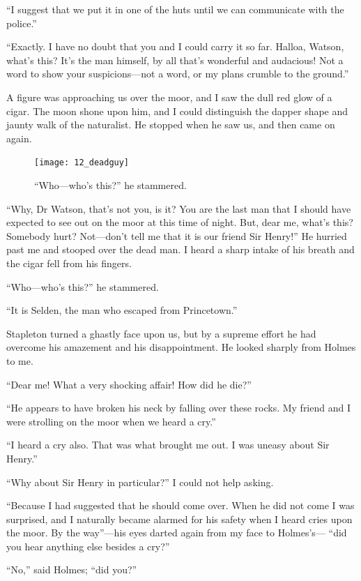 \documentclass[paper=a5,BCOR=7mm,twoside,DIV=calc,12pt,usegeometry,openany,chapterprefix,endperiod,headings=big]{scrbook} %
\begin{document}
\enquote{I suggest that we put it in one of the huts until we can communicate with the police.}

\enquote{Exactly. I have no doubt that you and I could carry it so far. Halloa, Watson, what's this? It's the man himself, by all that's wonderful and audacious! Not a word to show your suspicions---not a word, or my plans crumble to the ground.}

A figure was approaching us over the moor, and I saw the dull red glow of a cigar. The moon shone upon him, and I could distinguish the dapper shape and jaunty walk of the naturalist. He stopped when he saw us, and then came on again.

\begin{figure}[tbph]
\centering
\texttt{[image: 12\_deadguy]}
\caption{\enquote{Who---who's this?} he stammered.}
\end{figure}

\enquote{Why, Dr Watson, that's not you, is it? You are the last man that I should have expected to see out on the moor at this time of night. But, dear me, what's this? Somebody hurt? Not---don't tell me that it is our friend Sir Henry!} He hurried past me and stooped over the dead man. I heard a sharp intake of his breath and the cigar fell from his fingers.

\enquote{Who---who's this?} he stammered.

\enquote{It is Selden, the man who escaped from Princetown.}

Stapleton turned a ghastly face upon us, but by a supreme effort he had overcome his amazement and his disappointment. He looked sharply from Holmes to me.

\enquote{Dear me! What a very shocking affair! How did he die?}

\enquote{He appears to have broken his neck by falling over these rocks. My friend and I were strolling on the moor when we heard a cry.}

\enquote{I heard a cry also. That was what brought me out. I was uneasy about Sir Henry.}

\enquote{Why about Sir Henry in particular?} I could not help asking.

\enquote{Because I had suggested that he should come over. When he did not come I was surprised, and I naturally became alarmed for his safety when I heard cries upon the moor. By the way}---his eyes darted again from my face to Holmes's--- \enquote{did you hear anything else besides a cry?}

\enquote{No,} said Holmes; \enquote{did you?}
\end{document}

